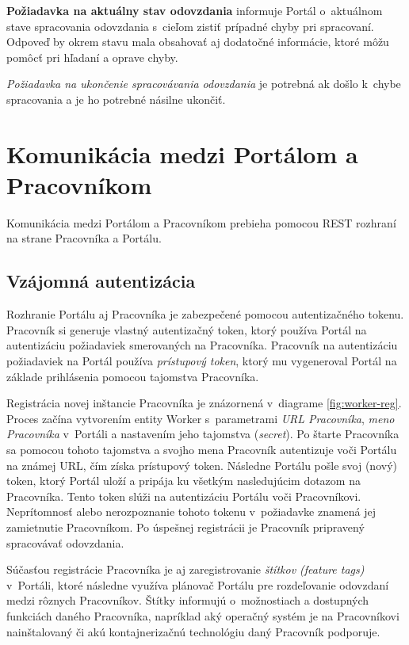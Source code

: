 \documentclass[
  digital, %
  oneside, %
  table,   %
  lof,     %
  lot,   %
]{fithesis3}
\begin{document}
\textbf{Požiadavka na aktuálny stav odovzdania} informuje Portál o~aktuálnom stave spracovania odovzdania s~cieľom zistiť prípadné chyby pri spracovaní. Odpoveď by okrem stavu mala obsahovať aj dodatočné informácie, ktoré môžu pomôcť pri hľadaní a oprave chyby.

\emph{Požiadavka na ukončenie spracovávania odovzdania} je potrebná ak došlo k~chybe spracovania a je ho potrebné násilne ukončiť.

\section{Komunikácia medzi Portálom a Pracovníkom}

Komunikácia medzi Portálom a Pracovníkom prebieha pomocou REST rozhraní na strane Pracovníka a Portálu. 

\subsection{Vzájomná autentizácia}
\label{komunikacia-portal-pracovnik}

Rozhranie Portálu aj Pracovníka je zabezpečené pomocou autentizačného tokenu. Pracovník si generuje vlastný autentizačný token, ktorý používa Portál na autentizáciu požiadaviek smerovaných na Pracovníka. Pracovník na autentizáciu požiadaviek na Portál používa \emph{prístupový token}, ktorý mu vygeneroval Portál na základe prihlásenia pomocou tajomstva Pracovníka.

Registrácia novej inštancie Pracovníka je znázornená v~diagrame \ref{fig:worker-reg}. Proces začína vytvorením entity Worker s~parametrami \emph{URL Pracovníka}, \emph{meno Pracovníka} v~Portáli a nastavením jeho tajomstva (\emph{secret}). Po štarte Pracovníka sa pomocou tohoto tajomstva a svojho mena Pracovník autentizuje voči Portálu na známej URL, čím získa prístupový token. Následne Portálu pošle svoj (nový) token, ktorý Portál uloží a pripája ku všetkým nasledujúcim dotazom na Pracovníka. Tento token slúži na autentizáciu Portálu voči Pracovníkovi. Neprítomnosť alebo nerozpoznanie tohoto tokenu v~požiadavke znamená jej zamietnutie Pracovníkom. Po úspešnej registrácii je Pracovník pripravený spracovávať odovzdania.

Súčasťou registrácie Pracovníka je aj zaregistrovanie \emph{štítkov (feature tags)} v~Portáli, ktoré následne využíva plánovač Portálu pre rozdeľovanie odovzdaní medzi rôznych Pracovníkov. Štítky informujú o~možnostiach a dostupných funkciách daného Pracovníka, napríklad aký operačný systém je na Pracovníkovi nainštalovaný či akú kontajnerizačnú technológiu daný Pracovník podporuje. 
\end{document}
